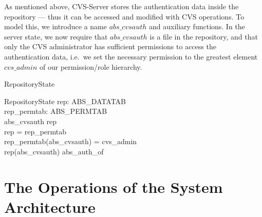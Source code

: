As mentioned above, CVS-Server stores the authentication data inside the
repository --- thus it can be accessed and modified with CVS operations.  To
model this, we introduce a name $abs\_cvsauth$ and auxiliary functions.  In the
server state, we now require that $abs\_cvsauth$ is a file in the repository,
and that only the CVS administrator has sufficient permissions to access the
authentication data, i.e.\ we set the necessary permission to the greatest
element $cvs\_admin$ of our permission/role hierarchy.
\begin{doc}{RepositoryState}
  \begin{schema}{RepositoryState}
    rep: ABS\_DATATAB \\  
    rep\_permtab: ABS\_PERMTAB \\
    \where
    abs\_cvsauth \in \dom rep \\
    \dom rep = \dom rep\_permtab \\
    rep\_permtab(abs\_cvsauth) = cvs\_admin \\
    rep(abs\_cvsauth) \in \dom abs\_auth\_of \\ 
  \end{schema}
\end{doc}


\section{The Operations of the System Architecture}

\vspace{1ex}\noindent

